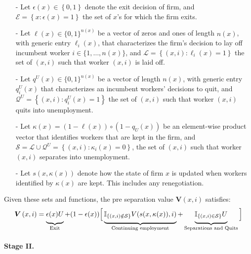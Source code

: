 \begin{itemize}
\item[-] Let $\epsilon(x)\in \left\{ 0,1\right\}$ denote the exit decision
of firm, and $\mathcal{E=}\left\{ x:\epsilon (x)=1\right\}$ the set of $x$'s
for which the firm exits.

\item[-] Let $\ell(x)\in\{0,1\}^{n(x)}$ be a vector of zeros and ones of length $n(x)$, with generic entry
$\ell_{i}(x)$, that characterizes the
firm's decision to lay off incumbent worker $i\in\{1,\dots,n(x)\}$, and $\mathcal{L=}%
\left\{\left( x,i\right) :\ell _{i}(x)=1\right\}$ the set of $(x,i)$ such
that worker $(x,i)$ is laid off.

\item[-] Let $q^U\left( x\right) \in\{0,1\}^{n(x)}$ be a vector of length $%
n(x)$, with generic entry $q^U_i(x)$ that characterizes an incumbent
workers' decisions to quit, and $\mathcal{Q}^{U}=\left\{ \left(
x,i\right):q^U_i(x)=1\right\} $ the set of $(x,i)$ such that worker $(x,i)$
quits into unemployment.

\item[-] Let $\kappa\left( x\right) =\left( 1-\bm{\ell}\left( x\right)
\right) \circ \left( 1-q_{U}\left( x\right) \right)$ be an element-wise
product vector that identifies workers that are kept in the firm, and $%
\mathcal{S}=\mathcal{L}\cup\mathcal{Q}^{U}=\left\{\left(x,i\right):%
\kappa_{i}\left( x\right) =0\right\}$, the set of $(x,i)$ such that worker $%
(x,i)$ separates into unemployment.

\item[-] Let $s(x,\kappa(x))$ denote how the state of firm $x$ is updated
when workers identified by $\kappa(x)$ are kept. This includes any renegotiation.
\end{itemize}

\noindent Given these sets and functions, the pre separation value $\bm{V}\left(
x,i\right) $ satisfies:
\begin{equation*}
\bm{V}\left( x,i\right) =\underbrace{\Big.\epsilon(x)U\Big.}_{\text{Exit}%
} + (1-\epsilon(x))\Big[\underbrace{\Big.\mathbb{I}_{\{(x,i)\notin \mathcal{S}%
\}} V(s(x,\kappa(x)),i)\Big.}_{\text{Continuing employment}} + \underbrace{%
\Big.\mathbb{I}_{\{(x,i)\in \mathcal{S}\}}U\Big.}_{\text{Separations and
Quits}}\Big]
\end{equation*}

\paragraph{Stage II.}

